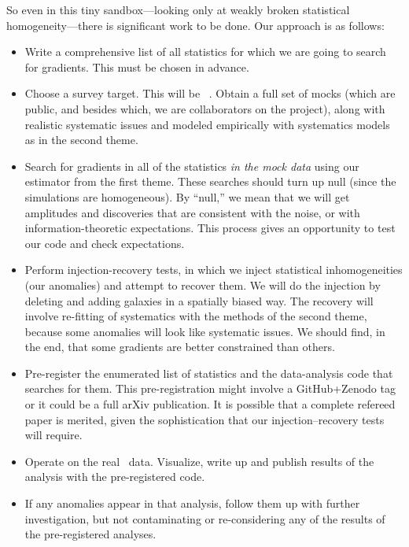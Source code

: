\documentclass[12pt, fullpage, letterpaper]{article}
\begin{document}
So even in this tiny sandbox---looking only at weakly broken
statistical homogeneity---there is significant work to be done.
Our approach is as follows:
\begin{itemize}
\item
Write a comprehensive list of all statistics for which we are going to search
for gradients. This must be chosen in advance.
\item
Choose a survey target. This will be
\SDSSIV\ \eBOSS. Obtain a full set of mocks (which are public, and besides which, we are collaborators on the project), along
with realistic systematic issues and modeled empirically with
systematics models as in the second theme.
\item
Search for gradients in all of the statistics \emph{in the mock
data} using our estimator from the first theme.
These searches should turn up null (since the simulations are
homogeneous). By ``null,'' we mean
that we will get amplitudes and discoveries that are consistent with the noise, or with
information-theoretic expectations.
This process gives an
opportunity to test our code and check expectations.
\item
Perform injection-recovery tests, in which we inject statistical inhomogeneities (our anomalies)
and attempt to recover them.
We will do the injection by deleting and adding galaxies in a
spatially biased way.
The recovery will involve re-fitting of systematics with the methods of the second
theme, because some anomalies will look like systematic issues.
We should find, in the end, that some gradients are better constrained than others.
\item
Pre-register the enumerated list of statistics and the data-analysis code that
searches for them.
This pre-registration might involve a GitHub+Zenodo tag or it could be
a full arXiv publication. It is possible that a complete refereed paper
is merited, given the sophistication that our injection--recovery tests will require.
\item
Operate on the real \eBOSS\ data. Visualize, write up and publish results of the
analysis with the pre-registered code.
\item
If any anomalies appear in that analysis, follow them up with further
investigation, but not contaminating or re-considering any of the results
of the pre-registered analyses.
\end{itemize}
\end{document}
